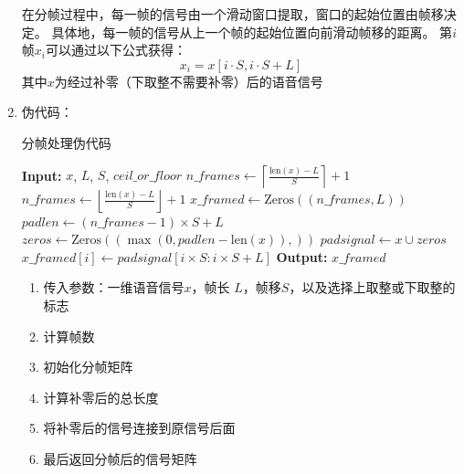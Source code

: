 \documentclass[a4paper]{article}
\begin{document}
\begin{enumerate}
{\begin{enumerate}
      在分帧过程中，每一帧的信号由一个滑动窗口提取，窗口的起始位置由帧移决定。
      具体地，每一帧的信号从上一个帧的起始位置向前滑动帧移的距离。
      第$i$帧$x_i$可以通过以下公式获得：
      \begin{equation}
        x_i = x\left[i\cdot S, i\cdot S + L \right]
        \label{eq:enframe}
      \end{equation}
      其中$x$为经过补零（下取整不需要补零）后的语音信号
      
    \end{enumerate}
  }
  \item
  {
    伪代码：
    \begin{algorithm}
      \caption{分帧处理伪代码}
      \label{alg:enframe}
      \begin{algorithmic}[1]
      \State \textbf{Input:} $x$, $L$, $S$, $ceil\_or\_floor$
          \State $n\_frames \gets \left\lceil \frac{\text{len}(x) - L}{S} \right\rceil + 1$
          \State $n\_frames \gets \left\lfloor \frac{\text{len}(x) - L}{S} \right\rfloor + 1$
      \EndIf
      \State $x\_framed \gets \text{Zeros}((n\_frames, L))$
      \State $padlen \gets (n\_frames - 1) \times S + L$
      \State $zeros \gets \text{Zeros}((\max(0 ,padlen - \text{len}(x)),))$
      \State $padsignal \gets x \cup zeros$
          \State $x\_framed[i] \gets padsignal[i \times S : i \times S + L]$
      \EndFor
      \State \textbf{Output:} $x\_framed$
      \end{algorithmic}
    \end{algorithm}

    \begin{enumerate}
      \item 传入参数：一维语音信号$x$，帧长 $L$，帧移$S$，以及选择上取整或下取整的标志
      \item 计算帧数
      \item 初始化分帧矩阵
      \item 计算补零后的总长度
      \item 将补零后的信号连接到原信号后面
      \item 最后返回分帧后的信号矩阵
    \end{enumerate}
  }
\end{enumerate}
\end{document}
